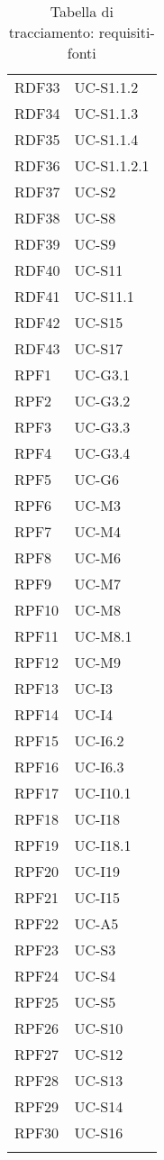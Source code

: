 \begin{longtable}{| p{5cm} | p{5cm} |}
		RDF33 & UC-S1.1.2\\
		\rowcolor{LightGray}
		RDF34 & UC-S1.1.3\\%
		RDF35 & UC-S1.1.4\\		%
		\rowcolor{LightGray}
		RDF36 & UC-S1.1.2.1 \\
		RDF37 & UC-S2\\
		\rowcolor{LightGray}
		RDF38 & UC-S8\\
		RDF39 & UC-S9\\
		\rowcolor{LightGray}
		RDF40 & UC-S11 \\
		RDF41 & UC-S11.1 \\
		\rowcolor{LightGray}
		RDF42 & UC-S15\\
		RDF43 & UC-S17\\		%
		\rowcolor{LightGray}
		RPF1 & UC-G3.1\\
		RPF2 & UC-G3.2\\
		\rowcolor{LightGray}
		RPF3 & UC-G3.3\\
		RPF4 & UC-G3.4\\
		\rowcolor{LightGray}
		RPF5 & UC-G6\\
		RPF6 & UC-M3\\
		\rowcolor{LightGray}
		RPF7 & UC-M4\\
		RPF8 & UC-M6\\
		\rowcolor{LightGray}
		RPF9 & UC-M7\\
		RPF10 & UC-M8\\
		\rowcolor{LightGray}
		RPF11 & UC-M8.1\\
		RPF12 & UC-M9\\
		\rowcolor{LightGray}
		RPF13 & UC-I3\\
		RPF14 & UC-I4\\
		\rowcolor{LightGray}
		RPF15 & UC-I6.2\\
		RPF16 & UC-I6.3\\
		\rowcolor{LightGray}
		RPF17 & UC-I10.1\\
		RPF18 & UC-I18\\
		\rowcolor{LightGray}
		RPF19 & UC-I18.1\\
		RPF20 & UC-I19\\	
		\rowcolor{LightGray}
		RPF21 & UC-I15\\
		RPF22 & UC-A5\\
		\rowcolor{LightGray}
		RPF23 & UC-S3\\
		RPF24 & UC-S4\\
		\rowcolor{LightGray}
		RPF25 & UC-S5\\
		RPF26 & UC-S10\\
		\rowcolor{LightGray}
		RPF27 & UC-S12\\
		RPF28 & UC-S13\\	
		\rowcolor{LightGray}
		RPF29 & UC-S14\\
		RPF30 & UC-S16\\
		\hline
		\caption{Tabella di tracciamento: requisiti-fonti}
\end{longtable}

